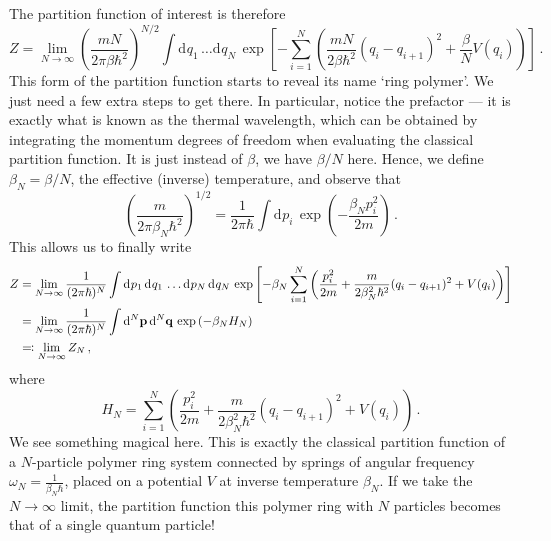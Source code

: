 \documentclass{article}
\theoremstyle{plain}\theoremheaderfont{\normalfont\itshape}\theorembodyfont{\rmfamily}\theoremseparator{.}\newtheorem*{rem}{Remark}\newtheorem*{ex}{Example}\newtheorem*{proof}{Proof}\newtheorem*{altp}{Alternative proof}
\theoremstyle{plain}\theoremheaderfont{\normalfont\bfseries}\theorembodyfont{\rmfamily}\theoremseparator{.}\newtheorem{thm}{Theorem}[section]\newtheorem{lem}[thm]{Lemma}\newtheorem{prop}[thm]{Proposition}\newtheorem*{cor}{Corollary}\newtheorem{defn}[thm]{Definition}\newtheorem{clm}[thm]{Claim}\newtheorem{clminproof}{Claim}
\theoremstyle{break}\theoremheaderfont{\normalfont\itshape}\theorembodyfont{\rmfamily}\theoremseparator{.\medskip}\newtheorem*{proofskip}{Proof}\newtheorem*{exs}{Examples}\newtheorem*{rems}{Remarks}
\theoremstyle{break}\theoremheaderfont{\normalfont\bfseries}\theorembodyfont{\rmfamily}\theoremseparator{.\medskip}\newtheorem{lemskip}[thm]{Lemma}\newtheorem{defnskip}[thm]{Definition}\newtheorem{propskip}[thm]{Proposition}\newtheorem{thmskip}[thm]{Theorem}
\numberwithin{equation}{section}
\newcommand{\dd}[2][]{\mathrm{d}^{#1} #2\,}
\newcommand{\vb}[1]{\bm{\mathrm{#1}}}
\begin{document}
    The partition function of interest is therefore
    \begin{equation}
        Z=\lim_{N\to\infty}\left(\frac{mN}{2\pi\beta\hbar^2}\right)^{N/2}\int\dd{q_1}\dots\dd{q_N}\exp\left[-\sum_{i=1}^{N}\left(\frac{mN}{2\beta\hbar^2}(q_i - q_{i+1})^2+\frac{\beta}{N}V(q_i)\right)\right]\,.
    \end{equation}
    This form of the partition function starts to reveal its name `ring polymer'. We just need a few extra steps to get there. In particular, notice the prefactor --- it is exactly what is known as the thermal wavelength, which can be obtained by integrating the momentum degrees of freedom when evaluating the classical partition function. It is just instead of \(\beta\), we have \(\beta/N\) here. Hence, we define \(\beta_N=\beta/N\), the effective (inverse) temperature, and observe that
    \begin{equation}
        \left(\frac{m}{2\pi\beta_N\hbar^2}\right)^{1/2}=\frac{1}{2\pi\hbar}\int\dd{p_i}\exp\left(-\frac{\beta_N p_i^2}{2m}\right)\,.
    \end{equation}
    This allows us to finally write
    \begin{align}
        Z&=\lim_{N\to\infty}\frac{1}{(2\pi\hbar)^N}\int\dd{p_1}\dd{q_1}\dots\dd{p_N}\dd{q_N}\exp\left[-\beta_N\sum_{i=1}^{N}\left(\frac{p_i^2}{2m}+\frac{m}{2\beta_N^2\hbar^2}(q_i-q_{i+1})^2+V(q_i)\right)\right]\notag\\
        &=\lim_{N\to\infty}\frac{1}{(2\pi\hbar)^N}\int\dd[N]{\vb{p}}\dd[N]{\vb{q}}\exp\left(-\beta_N H_N\right)\notag\\
        &\eqqcolon\lim_{N\to\infty} Z_N\,,
    \end{align}
    where
    \begin{equation}
        H_N=\sum_{i=1}^{N}\left(\frac{p_i^2}{2m}+\frac{m}{2\beta_N^2\hbar^2}(q_i-q_{i+1})^2+V(q_i)\right)\,.
    \end{equation}
    We see something magical here. This is exactly the classical partition function of a \(N\)-particle polymer ring system connected by springs of angular frequency \(\omega_N=\frac{1}{\beta_N\hbar}\), placed on a potential \(V\) at inverse temperature \(\beta_N\). If we take the \(N\to\infty\) limit, the partition function this polymer ring with \(N\) particles becomes that of a single quantum particle!

    \newpage
\end{document}
